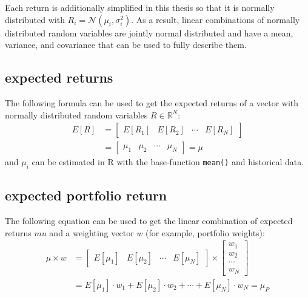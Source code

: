 \documentclass[
  oneside]{book}
\begin{document}
Each return is additionally simplified in this thesis so that it is normally distributed with \(R_i = \mathcal{N}(\mu_i, \sigma_i^2)\). As a result, linear combinations of normally distributed random variables are jointly normal distributed and have a mean, variance, and covariance that can be used to fully describe them.

\hypertarget{expected-returns}{%
\subsection{expected returns}\label{expected-returns}}

The following formula can be used to get the expected returns of a vector with normally distributed random variables \(R \in \mathbb{R}^{N}\):
\begin{align*}
  E[R] &=
  \begin{bmatrix}
    E[R_{1}] & E[R_{2}] & \cdots & E[R_{N}]  
 \end{bmatrix}\\
 &=
 \begin{bmatrix}
    \mu_{1} & \mu_{2} & \cdots & \mu_{N} 
 \end{bmatrix}
 =
 \mu
\end{align*}
and \(\mu_i\) can be estimated in R with the base-function \texttt{mean()} and historical data.

\hypertarget{expected-portfolio-return}{%
\subsection{expected portfolio return}\label{expected-portfolio-return}}

The following equation can be used to get the linear combination of expected returns \(mu\) and a weighting vector \(w\) (for example, portfolio weights):
\begin{align*}
 \mu \times w &=
  \begin{bmatrix}
    E[\mu_{1}] & E[\mu_{2}] & \cdots & E[\mu_{N}]
 \end{bmatrix}
  \times 
  \begin{bmatrix}
    w_{1} \\ 
    w_{2} \\
    \cdots \\
    w_{N}  
 \end{bmatrix} \\
 &=
 E[\mu_{1}] \cdot w_1 + E[\mu_{2}] \cdot w_2 + \cdots + E[\mu_{N}] \cdot w_{N} 
 =
 \mu_P
\end{align*}
\end{document}

